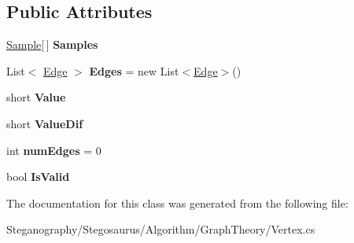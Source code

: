 \subsection*{Public Attributes}
\begin{DoxyCompactItemize}
\item 
\hyperlink{class_stegosaurus_1_1_algorithm_1_1_graph_theory_1_1_sample}{Sample}\mbox{[}$\,$\mbox{]} {\bfseries Samples}\hypertarget{class_stegosaurus_1_1_algorithm_1_1_graph_theory_1_1_vertex_a3254f850d0ce3fee41f27259e41ce31f}{}\label{class_stegosaurus_1_1_algorithm_1_1_graph_theory_1_1_vertex_a3254f850d0ce3fee41f27259e41ce31f}

\item 
List$<$ \hyperlink{class_stegosaurus_1_1_algorithm_1_1_graph_theory_1_1_edge}{Edge} $>$ {\bfseries Edges} = new List$<$\hyperlink{class_stegosaurus_1_1_algorithm_1_1_graph_theory_1_1_edge}{Edge}$>$()\hypertarget{class_stegosaurus_1_1_algorithm_1_1_graph_theory_1_1_vertex_a22f4be1090f0acf10ffb15d6c5d7a0b8}{}\label{class_stegosaurus_1_1_algorithm_1_1_graph_theory_1_1_vertex_a22f4be1090f0acf10ffb15d6c5d7a0b8}

\item 
short {\bfseries Value}\hypertarget{class_stegosaurus_1_1_algorithm_1_1_graph_theory_1_1_vertex_a935733b0ab048d9bc810ec9669905b06}{}\label{class_stegosaurus_1_1_algorithm_1_1_graph_theory_1_1_vertex_a935733b0ab048d9bc810ec9669905b06}

\item 
short {\bfseries Value\+Dif}\hypertarget{class_stegosaurus_1_1_algorithm_1_1_graph_theory_1_1_vertex_a56d8f272df5763992eb49d46bac8d436}{}\label{class_stegosaurus_1_1_algorithm_1_1_graph_theory_1_1_vertex_a56d8f272df5763992eb49d46bac8d436}

\item 
int {\bfseries num\+Edges} = 0\hypertarget{class_stegosaurus_1_1_algorithm_1_1_graph_theory_1_1_vertex_a0586048bb0cc119ff03943d77a71a187}{}\label{class_stegosaurus_1_1_algorithm_1_1_graph_theory_1_1_vertex_a0586048bb0cc119ff03943d77a71a187}

\item 
bool {\bfseries Is\+Valid}\hypertarget{class_stegosaurus_1_1_algorithm_1_1_graph_theory_1_1_vertex_a76da4ccf338f716af354c9f31856c222}{}\label{class_stegosaurus_1_1_algorithm_1_1_graph_theory_1_1_vertex_a76da4ccf338f716af354c9f31856c222}

\end{DoxyCompactItemize}


The documentation for this class was generated from the following file\+:\begin{DoxyCompactItemize}
\item 
Steganography/\+Stegosaurus/\+Algorithm/\+Graph\+Theory/Vertex.\+cs\end{DoxyCompactItemize}
